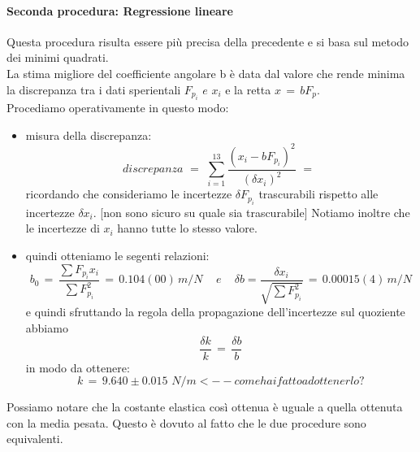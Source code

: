 \paragraph{Seconda procedura: Regressione lineare\\}
Questa procedura risulta essere più precisa della precedente e si basa sul metodo dei minimi quadrati.\\
La stima migliore del coefficiente angolare b è data dal valore che rende minima la discrepanza tra i dati sperientali $F_{p_i} \,\,e\,\, x_i$ e la retta $x \,=\, bF_p$.\\
Procediamo operativamente in questo modo:
\begin{itemize}
	\item{misura della discrepanza:
			\begin{equation*}
				discrepanza \,\,=\,\, \sum_{i=1}^{13} \frac{(x_i - bF_{p_i})^2}{(\delta x_i)^2} \,\,=\,\,		
			\end{equation*}
			ricordando che consideriamo le incertezze $\delta F_{p_i}$ trascurabili rispetto alle incertezze $\delta x_i$. [non sono sicuro su quale sia trascurabile] Notiamo inoltre che le incertezze di $x_i$ hanno tutte lo stesso valore.}
	\item{quindi otteniamo le segenti relazioni:
			\begin{equation*}
				b_0  \,=\,  \frac{\sum F_{p_i}  x_i}{\sum F_{p_i}^2} \,=\, 0.104(00) \, m/N \,\,\,\,\,\,\, e \,\,\,\,\,\,\,
				\delta b  =  \frac{\delta x_i}{\sqrt{\sum F_{p_i}^2}} \,=\, 0.00015(4) \, m/N
			\end{equation*}
			e quindi sfruttando la regola della propagazione dell'incertezze sul quoziente abbiamo
			\begin{equation*}
				\frac{\delta k}{k} \,=\, \frac{\delta b}{b}
			\end{equation*}
			in modo da ottenere:
			\begin{equation*}
				k \,=\, 9.640 \pm 0.015 \,\,N/m <-- come hai fatto ad ottenerlo?
			\end{equation*}
			}
\end{itemize}
Possiamo notare che la costante elastica così ottenua è uguale a quella ottenuta con la media pesata. Questo è dovuto al fatto che le due procedure sono equivalenti.

